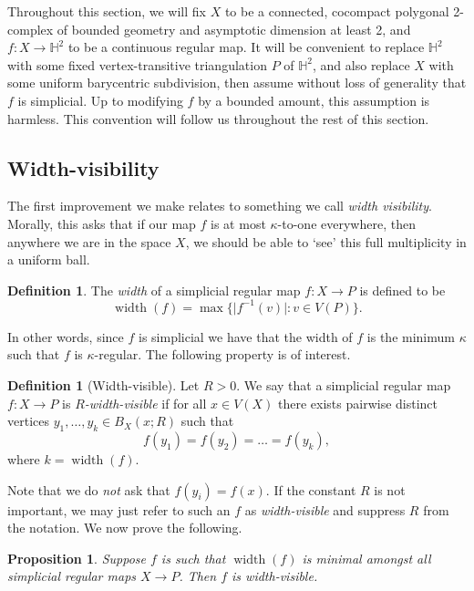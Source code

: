 \documentclass[11pt,a4paper]{amsart}
\DeclareMathOperator{\width}{width}
\newtheorem{proposition}[theorem]{Proposition}
\theoremstyle{definition}
\newtheorem{definition}[theorem]{Definition}
\begin{document}
Throughout this section, we will fix $X$ to be a connected, cocompact polygonal 2-complex of bounded geometry and asymptotic dimension  at least 2, and  $f : X \to \mathbb H^2$ to be a continuous regular map. It will be convenient to replace $\mathbb H^2$ with some fixed vertex-transitive triangulation $P$ of $\mathbb H^2$, and also replace $X$ with some uniform barycentric subdivision, then assume without loss of generality that $f$ is simplicial. Up to modifying $f$ by a bounded amount, this assumption is harmless. This convention will follow us throughout the rest of this section.


\subsection{Width-visibility}

The first improvement we make relates to something we call \emph{width visibility}. Morally, this asks that if our map $f$ is at most $\kappa$-to-one everywhere, then anywhere we are in the space $X$, we should be able to `see' this full multiplicity in a uniform ball. 




\begin{definition}
    The \emph{width} of a simplicial regular map $f : X \to P$ is defined to be 
    $$
    \width(f) = \max\Big\{\big|f^{-1}(v)\big|:v \in V(P)\Big\}.
    $$
\end{definition}

In other words, since $f$ is simplicial we have that the width of $f$ is the minimum $\kappa$ such that $f$ is $\kappa$-regular. 
The following property is of interest.

\begin{definition}[Width-visible]\label{defn:widthvisible}
    Let $R > 0$.
    We say that a simplicial regular map $f : X \to P$ is \emph{$R$-width-visible} if  for all $x \in V(X)$ there exists pairwise distinct vertices $y_1, \ldots, y_k \in B_X(x;R)$ such that
    $$
    f(y_1) = f(y_2) =\ldots = f(y_k),
    $$
    where $k = \width(f)$. 
\end{definition}

Note that we do \emph{not} ask that $f(y_i) = f(x)$.
If the constant $R$ is not important, we may just refer to such an $f$ as \emph{width-visible} and suppress $R$ from the notation.
We now prove the following. 

\begin{proposition}\label{prop:rank-visibility-whole-map}
    Suppose $f$ is such that $\width(f)$ is minimal amongst all simplicial regular maps $X \to P$. Then $f$ is width-visible.
\end{proposition}
\end{document}
